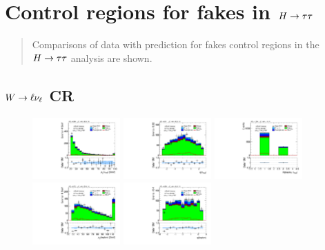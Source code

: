 \chapter[Control regions for fakes in $\Htautau$][Control regions for fakes in $\Htautau$]{Control regions for fakes in $\Htautau$}
\label{apx:control-regions}

\begin{quote}
Comparisons of data with prediction for fakes control regions in the $\Htautau$ analysis are shown.
\end{quote}

\section{$W \rightarrow \ell\nu_\ell$ CR}

\begin{figure}[!htpb]
  \centering
  \includegraphics[width=0.30\textwidth]{figures/analysis/vbf-WlvCR/tau-pt}
  \includegraphics[width=0.30\textwidth]{figures/analysis/vbf-WlvCR/tau-eta}
  \includegraphics[width=0.30\textwidth]{figures/analysis/vbf-WlvCR/tau-numTrack}
  \includegraphics[width=0.30\textwidth]{figures/analysis/vbf-WlvCR/lep-pt-hi}
  \includegraphics[width=0.30\textwidth]{figures/analysis/vbf-WlvCR/lep-eta}

\end{figure}
